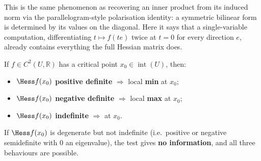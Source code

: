 \begin{remark}
This is the same phenomenon as recovering an inner product from its induced norm via the
parallelogram-style polarisation identity: a symmetric bilinear form is determined by its
values on the diagonal. Here it says that a single-variable computation, differentiating
$t\mapsto f(te)$ twice at $t=0$ for every direction $e$, already contains everything the full
Hessian matrix does.
\end{remark}

\begin{theorem}
\label{thm:hessian_test}
If $f \in C^2(U,\mathbb{R})$ has a critical point $x_0 \in \operatorname{int}(U)$, then:
\begin{itemize}
  \item $\Hess f(x_0)$ \textbf{positive definite} $\Rightarrow$ local \textbf{min} at $x_0$;
  \item $\Hess f(x_0)$ \textbf{negative definite} $\Rightarrow$ local \textbf{max} at $x_0$;
  \item $\Hess f(x_0)$ \textbf{indefinite} $\Rightarrow$ 
     at $x_0$.
\end{itemize}
If $\Hess f(x_0)$ is degenerate but not indefinite (i.e.\ positive or negative semidefinite with
$0$ an eigenvalue), the test gives \textbf{no information}, and all three behaviours are
possible.
\end{theorem}

